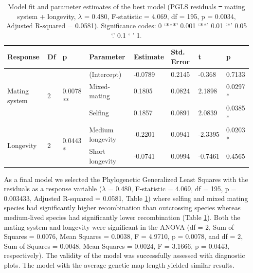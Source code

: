 \documentclass{article}
\providecommand{\DIFaddtex}[1]{{\protect\color{blue}\uwave{#1}}} %
\providecommand{\DIFdeltex}[1]{{\protect\color{red}\sout{#1}}}                      %
\providecommand{\DIFaddFL}[1]{\DIFadd{#1}} %
\providecommand{\DIFdelFL}[1]{\DIFdel{#1}} %
\providecommand{\DIFaddbeginFL}{} %
\providecommand{\DIFaddendFL}{} %
\providecommand{\DIFdelbeginFL}{} %
\providecommand{\DIFdelendFL}{} %
\providecommand{\DIFadd}[1]{\texorpdfstring{\DIFaddtex{#1}}{#1}} %
\providecommand{\DIFdel}[1]{\texorpdfstring{\DIFdeltex{#1}}{}} %
\newcommand{\DIFscaledelfig}{0.5}
\newlength{\DIFdelgraphicswidth} %
\newlength{\DIFdelgraphicsheight} %
\newcommand{\DIFaddincludegraphics}[2][]{{\color{blue}\fbox{\DIFOincludegraphics[#1]{#2}}}} %
\newcommand{\DIFdelincludegraphics}[2][]{%
\sbox{\DIFdelgraphicsbox}{\DIFOincludegraphics[#1]{#2}}%
\settoboxwidth{\DIFdelgraphicswidth}{\DIFdelgraphicsbox} %
\settoboxtotalheight{\DIFdelgraphicsheight}{\DIFdelgraphicsbox} %
\scalebox{\DIFscaledelfig}{%
\parbox[b]{\DIFdelgraphicswidth}{\usebox{\DIFdelgraphicsbox}\\[-\baselineskip] \rule{\DIFdelgraphicswidth}{0em}}\llap{\resizebox{\DIFdelgraphicswidth}{\DIFdelgraphicsheight}{%
\setlength{\unitlength}{\DIFdelgraphicswidth}%
\begin{picture}(1,1)%
\thicklines\linethickness{2pt} %
{\color[rgb]{1,0,0}\put(0,0){\framebox(1,1){}}}%
{\color[rgb]{1,0,0}\put(0,0){\line( 1,1){1}}}%
{\color[rgb]{1,0,0}\put(0,1){\line(1,-1){1}}}%
\end{picture}%
}\hspace*{3pt}}} %
} %
\DeclareRobustCommand{\DIFaddbeginFL}{\DIFOaddbeginFL \let\includegraphics\DIFaddincludegraphics} %
\DeclareRobustCommand{\DIFaddendFL}{\DIFOaddendFL \let\includegraphics\DIFOincludegraphics} %
\DeclareRobustCommand{\DIFdelbeginFL}{\DIFOdelbeginFL \let\includegraphics\DIFdelincludegraphics} %
\DeclareRobustCommand{\DIFdelendFL}{\DIFOaddendFL \let\includegraphics\DIFOincludegraphics} %
\begin{document}
\begin{table}[h!]
\centering{}
\caption{Model fit and parameter estimates of the best model (PGLS residuals \DIFdelbeginFL \DIFdelFL{~ }\DIFdelendFL \DIFaddbeginFL \DIFaddFL{= }\DIFaddendFL mating system + longevity, $\lambda$ = 0.480, F-statistic = 4.069, df = 195, p = 0.0034, Adjusted R-squared = 0.0581). Significance codes: 0 ‘***’ 0.001 ‘**’ 0.01 ‘*’ 0.05 ‘.’ 0.1 ‘ ’ 1.}
\begin{tabular}{llllllll}
Response                       & Df                 & p                       & Parameter        & Estimate & Std. Error & t       & p      \\ \hline
\multirow{3}{*}{Mating system} & \multirow{3}{*}{2} & \multirow{3}{*}{0.0078 **} & (Intercept)      & -0.0789  & 0.2145     & -0.368  & 0.7133 \\ \cline{4-8} 
                               &                    &                         & Mixed-mating     & 0.1805   & 0.0824     & 2.1898  & 0.0297 * \\
                               &                    &                         & Selfing          & 0.1857   & 0.0891     & 2.0839  & 0.0385 * \\ \cline{4-8} 
\multirow{2}{*}{Longevity}     & \multirow{2}{*}{2} & \multirow{2}{*}{0.0443 *} & Medium longevity & -0.2201  & 0.0941     & -2.3395 & 0.0203 * \\
                               &                    &                         & Short longevity  & -0.0741  & 0.0994     & -0.7461 & 0.4565
\end{tabular}
\label{table:table2}
\end{table}


As a final model we selected the Phylogenetic Generalized Least Squares with the residuals as a response variable ($\lambda$ = 0.480, F-statistic = 4.069, df = 195, p = 0.003433, Adjusted R-squared = 0.0581, Table \ref{table:table2}) where selfing and mixed mating species had significantly higher recombination than outcrossing species whereas medium-lived species had significantly lower recombination (Table \ref{table:table2}). Both the mating system and longevity were significant in the ANOVA (df = 2, Sum of Squares = 0.0076, Mean Squares = 0.0038, F = 4.9710, p = 0.0078, and df = 2, Sum of Squares = 0.0048, Mean Squares = 0.0024, F = 3.1666, p = 0.0443, respectively). The validity of the model was successfully assessed with diagnostic plots. The model with the average genetic map length yielded similar results.
\end{document}
